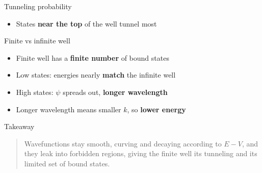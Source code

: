 \documentclass[
  ignorenonframetext,
  aspectratio=169,
  handout]{beamer}
\providecommand{\tightlist}{%
  \setlength{\itemsep}{0pt}\setlength{\parskip}{0pt}}
\begin{document}
\begin{frame}
\begin{block}{Tunneling probability}
\begin{itemize}
\tightlist
\item
  States \textbf{near the top} of the well tunnel most
\end{itemize}
\end{block}

\begin{block}{Finite vs infinite well}
\protect{}\label{finite-vs-infinite-well}
\begin{itemize}
\tightlist
\item
  Finite well has a \textbf{finite number} of bound states
\end{itemize}

\begin{itemize}
\tightlist
\item
  Low states: energies nearly \textbf{match} the infinite well
\end{itemize}

\begin{itemize}
\tightlist
\item
  High states: \(\psi\) spreads out, \textbf{longer wavelength}
\end{itemize}

\begin{itemize}
\tightlist
\item
  Longer wavelength means smaller \(k\), so \textbf{lower energy}
\end{itemize}
\end{block}
\end{frame}

\begin{frame}{Takeaway}
\protect{}\label{takeaway}
\begin{quote}
Wavefunctions stay smooth, curving and decaying according to \(E - V\),
and they leak into forbidden regions, giving the finite well its
tunneling and its limited set of bound states.
\end{quote}
\end{frame}
\end{document}
